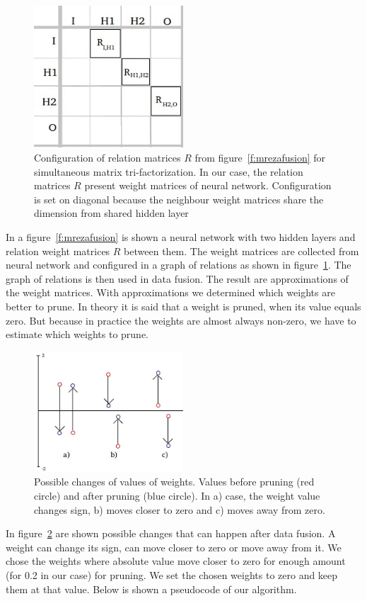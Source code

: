 \documentclass{article} %
\begin{document}
\begin{figure}[!ht]
\centering 
\includegraphics[width=2.2in]{tabelafusion.jpg}
\caption{Configuration of relation matrices $R$ from figure~\ref{f:mrezafusion} 
for simultaneous matrix tri-factorization. In our case, 
the relation matrices $R$ present weight matrices of neural network.
Configuration is set on diagonal because the neighbour weight matrices share the 
dimension
from shared hidden layer}
\label{f:tabelafusion}
\end{figure}  
In a figure~\ref{f:mrezafusion} is shown a neural network with two hidden layers 
and relation weight matrices $R$ between them. The weight matrices are collected 
from neural network and configured in a graph of relations as shown in 
figure~\ref{f:tabelafusion}. The graph of relations is then used in data fusion. 
The result are approximations of the weight matrices. With approximations we 
determined which weights are better to prune. In theory it is said that a weight 
is pruned, when its value equals zero. But because in practice the weights are 
almost always non-zero, we have to estimate which weights to prune.

\begin{figure}[!ht]
\centering 
\includegraphics[height=4.5cm]{kriterijrezanja.jpg}
\caption{Possible changes of values of weights. Values before pruning (red 
circle) and after pruning (blue circle). In a) case, the weight value changes 
sign, b) moves closer to zero and c) moves away from zero.}
\label{f:spremembeutezi}
\end{figure}
In figure~\ref{f:spremembeutezi} are shown possible changes that can happen 
after data fusion. A weight can change its sign, can move closer to zero or move 
away from it. We chose the weights where absolute value move closer to zero for 
enough amount (for 0.2 in our case) for pruning. We set the chosen weights to 
zero and keep them at that value. Below is shown a pseudocode of our algorithm.
\end{document}
